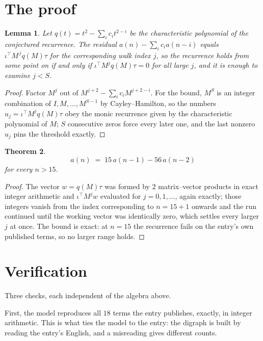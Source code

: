 \documentclass[11pt,a4paper]{article}
\theoremstyle{plain}
\newtheorem{theorem}{Theorem}
\newtheorem{lemma}[theorem]{Lemma}
\theoremstyle{definition}
\begin{document}
\section{The proof}

\begin{lemma}\label{lem:crit}
Let $q(t)=t^{2}-\sum_i c_it^{2-i}$ be the characteristic polynomial of the
conjectured recurrence. The residual $a(n)-\sum_ic_ia(n-i)$ equals
$\iota^{\!\top}M^{\,j}q(M)\tau$ for the corresponding walk index $j$, so the recurrence
holds from some point on if and only if $\iota^{\!\top}M^{j}q(M)\tau=0$ for all large $j$,
and it is enough to examine $j<S$.
\end{lemma}

\begin{proof}
Factor $M^{j}$ out of $M^{j+2}-\sum_ic_iM^{j+2-i}$. For the bound, $M^{S}$
is an integer combination of $I,M,\dots,M^{S-1}$ by Cayley--Hamilton, so the numbers
$u_j=\iota^{\!\top}M^{j}q(M)\tau$ obey the monic recurrence given by the characteristic
polynomial of $M$; $S$ consecutive zeros force every later one, and the last nonzero $u_j$
pins the threshold exactly.
\end{proof}

\begin{theorem}
\[
a(n)\;=\;15\,a(n-1) - 56\,a(n-2)
\]
for every $n>15$.
\end{theorem}

\begin{proof}
The vector $w=q(M)\tau$ was formed by $2$ matrix--vector products in exact integer
arithmetic and $\iota^{\!\top}M^{j}w$ evaluated for $j=0,1,\dots$, again exactly; those
integers vanish from the index corresponding to $n=15+1$ onwards and the run continued
until the working vector was identically zero, which settles every larger $j$ at once. The bound is exact: at $n=15$ the recurrence fails on the entry's own published terms, so no larger range holds.
\end{proof}

\section{Verification}

Three checks, each independent of the algebra above.

First, the model reproduces all $18$ terms the entry publishes, exactly, in integer
arithmetic. This is what ties the model to the entry: the digraph is built by reading the
entry's English, and a misreading gives different counts.
\end{document}
